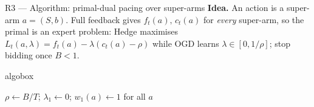 \documentclass[12pt,aspectratio=169]{beamer}
\newenvironment{algobox}[1][\textwidth]
  {\begin{beamercolorbox}[sep=0.45em,wd=#1]{algobox}}
  {\end{beamercolorbox}}
\begin{document}
\begin{frame}{R3 --- Algorithm: primal-dual pacing over super-arms}
\scriptsize
\textbf{Idea.} An action is a super-arm $a=(S,b)$. Full feedback gives
$f_t(a),\,c_t(a)$ for \emph{every} super-arm, so the primal is an expert problem:
Hedge maximises $L_t(a,\lambda)=f_t(a)-\lambda(c_t(a)-\rho)$ while OGD learns
$\lambda\in[0,1/\rho]$; stop bidding once $B<1$.

\begin{algobox}
\begin{algorithm}[H]
  \scriptsize
  \caption{\scriptsize Primal-dual bidding (full feedback)}
  $\rho\leftarrow B/T$;\; $\lambda_1\leftarrow0$;\; $w_1(a)\leftarrow1$ for all $a$\;
\end{algorithm}
\end{algobox}
\end{frame}
\end{document}
